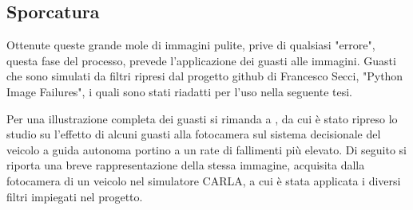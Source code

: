 \documentclass[14pt]{extarticle}
\begin{document}
\subsection{Sporcatura}
Ottenute queste grande mole di immagini pulite, prive di qualsiasi "errore", questa fase del processo, prevede l'applicazione dei guasti alle immagini.
Guasti che sono simulati da filtri ripresi dal progetto github di Francesco Secci, "Python Image Failures", i quali sono stati riadatti per l'uso nella seguente tesi.

Per una illustrazione completa dei guasti si rimanda  a \cite{secci2020failures}, da cui è stato ripreso lo studio su l'effetto di alcuni guasti alla fotocamera sul sistema decisionale del veicolo a guida autonoma portino a un rate di fallimenti più elevato. 
Di seguito si riporta una breve rappresentazione della stessa immagine, acquisita dalla fotocamera di un veicolo nel simulatore CARLA, a cui è stata applicata i diversi filtri impiegati nel progetto.
\end{document}
